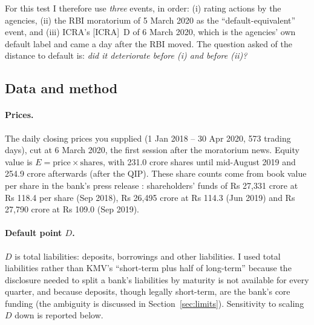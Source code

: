 For this test I therefore use \emph{three} events, in order: (i) rating actions by the agencies, (ii) the RBI moratorium of 5 March 2020 as the ``default-equivalent'' event, and (iii) ICRA's [ICRA]~D of 6 March 2020, which is the agencies' own default label and came a day after the RBI moved. The question asked of the distance to default is: \emph{did it deteriorate before (i) and before (ii)?}

\subsection{Data and method}
\paragraph{Prices.} The daily closing prices you supplied (1 Jan 2018 -- 30 Apr 2020, 573 trading days), cut at 6 March 2020, the first session after the moratorium news. Equity value is $E=\text{price}\times\text{shares}$, with 231.0 crore shares until mid-August 2019 and 254.9 crore afterwards (after the QIP). These share counts come from book value per share in the bank's press release \cite{ycQ2}: shareholders' funds of Rs 27,331 crore at Rs 118.4 per share (Sep 2018), Rs 26,495 crore at Rs 114.3 (Jun 2019) and Rs 27,790 crore at Rs 109.0 (Sep 2019).

\paragraph{Default point $D$.} $D$ is total liabilities: deposits, borrowings and other liabilities. I used total liabilities rather than KMV's ``short-term plus half of long-term'' because the disclosure needed to split a bank's liabilities by maturity is not available for every quarter, and because deposits, though legally short-term, are the bank's core funding (the ambiguity is discussed in Section~\ref{sec:limits}). Sensitivity to scaling $D$ down is reported below.

